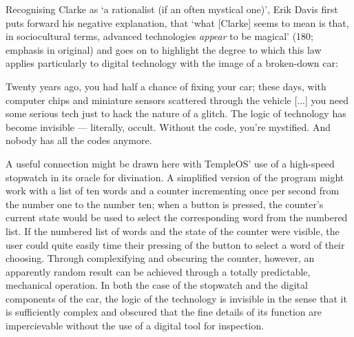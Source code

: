 Recognising Clarke as `a rationalist (if an often mystical one)',
Erik Davis first puts forward his negative explanation, that
`what [Clarke] seems to mean is that, in sociocultural terms, advanced
technologies \textit{appear} to be magical' (180; emphasis in original)
and goes on to highlight the degree to which this law applies particularly
to digital technology with the image of a broken-down car:
\begin{displayquote}
  Twenty years ago, you had half a chance of fixing your car; these days,
  with computer chips and miniature sensors scattered through the vehicle
  [...] you need some serious tech just to hack the nature of a glitch.
  The logic of technology has become invisible --- literally, occult.
  Without the code, you're mystified.
  And nobody has all the codes anymore.
\end{displayquote}
A useful connection might be drawn here with TempleOS' use of a high-speed
stopwatch in its oracle for divination.
A simplified version of the program might work with a list of ten words
and a counter incrementing once per second from the number one to the number
ten; when a button is pressed, the counter's current state would be used to
select the corresponding word from the numbered list.
If the numbered list of words and the state of the counter were visible,
the user could quite easily time their pressing of the button to select
a word of their choosing.
Through complexifying and obscuring the counter, however, an apparently
random result can be achieved through a totally predictable,
mechanical operation.
In both the case of the stopwatch and the digital components of the car,
the logic of the technology is invisible in the sense that
it is sufficiently complex and obscured that the fine details of
its function are impercievable without
the use of a digital tool for inspection.

